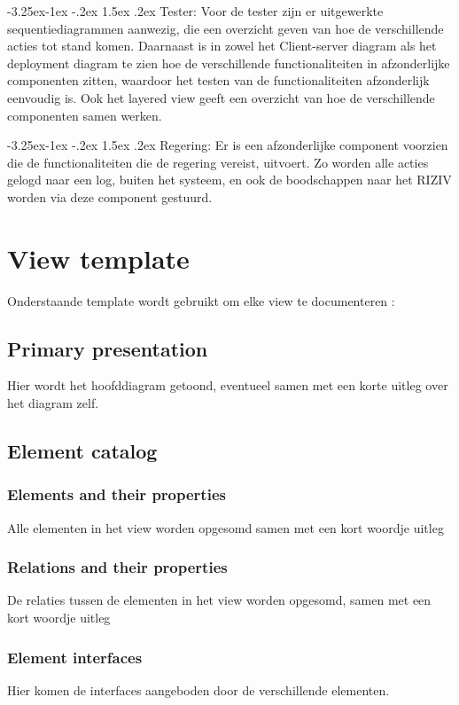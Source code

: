 \documentclass[a4paper,10pt]{article}
\makeatletter
\renewcommand\paragraph{\@startsection{paragraph}{4}{\z@}%
  {-3.25ex\@plus -1ex \@minus -.2ex}%
  {1.5ex \@plus .2ex}%
  {\normalfont\normalsize\bfseries}}
\makeatother
\begin{document}
\paragraph{Tester:}
Voor de tester zijn er uitgewerkte sequentiediagrammen aanwezig, die een overzicht geven van hoe de verschillende acties tot stand komen. Daarnaast is in zowel het Client-server diagram als het deployment diagram te zien hoe de verschillende functionaliteiten in afzonderlijke componenten zitten, waardoor het testen van de functionaliteiten afzonderlijk eenvoudig is. Ook het layered view geeft een overzicht van hoe de verschillende componenten samen werken.

\paragraph{Regering:}
Er is een afzonderlijke component voorzien die de functionaliteiten die de regering vereist, uitvoert. Zo worden alle acties gelogd naar een log, buiten het systeem, en ook de boodschappen naar het RIZIV worden via deze component gestuurd. 

\section{View template}

Onderstaande template wordt gebruikt om elke view te documenteren : 
\subsection{Primary presentation}
Hier wordt het hoofddiagram getoond, eventueel samen met een korte uitleg over het diagram zelf.
\subsection{Element catalog}
\subsubsection*{Elements and their properties}
Alle elementen in het view worden opgesomd samen met een kort woordje uitleg
\subsubsection*{Relations and their properties}
De relaties tussen de elementen in het view worden opgesomd, samen met een kort woordje uitleg
\subsubsection*{Element interfaces}
Hier komen de interfaces aangeboden door de verschillende elementen.
\end{document}

